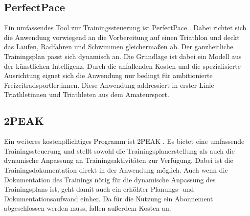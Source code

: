 \subsection{PerfectPace}
Ein umfassendes Tool zur Trainingssteuerung ist PerfectPace \cite{PerfectPaceWeb}. Dabei richtet sich die Anwendung vorwiegend an die Vorbereitung auf einen Triathlon und deckt das Laufen, Radfahren und Schwimmen gleichermaßen ab. Der ganzheitliche Trainingsplan passt sich dynamisch an. Die Grundlage ist dabei ein Modell aus der künstlichen Intelligenz. Durch die anfallenden Kosten und die spezialisierte Ausrichtung eignet sich die Anwendung nur bedingt für ambitionierte Freizeitradsportler:innen. Diese Anwendung addressiert in erster Linie Triathletinnen und Triathleten aus dem Amateursport.

\subsection{2PEAK}
Ein weiteres kostenpflichtiges Programm ist 2PEAK \cite{2PeakWeb}. Es bietet eine umfassende Trainingssteuerung und stellt sowohl die Trainingsplanerstellung als auch die dynamische Anpassung an Trainingsaktivitäten zur Verfügung. Dabei ist die Trainingsdokumentation direkt in der Anwendung möglich. Auch wenn die Dokumentation des Trainings nötig für die dynamische Anpassung des Trainingsplans ist, geht damit auch ein erhöhter Planungs- und Dokumentationsaufwand einher. Da für die Nutzung ein Abonnement abgeschlossen werden muss, fallen außerdem Kosten an.
